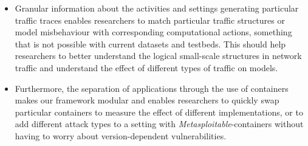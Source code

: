 \documentclass[sigconf]{acmart}
\begin{document}
\begin{itemize}
\begin{itemize}
\item Granular information about the activities and settings generating particular traffic traces enables researchers to match particular traffic structures or model misbehaviour with corresponding computational actions, something that is not possible with current datasets and testbeds. This should help researchers to
better understand the logical small-scale structures in network traffic and understand the effect of different types of traffic on models. 

\item Furthermore, the separation of applications through the use of containers makes our framework modular and enables researchers to quickly swap particular containers to measure the effect of different implementations, or to add different attack types to a setting with \textit{Metasploitable}-containers without having to worry about version-dependent vulnerabilities.
\end{itemize}
\end{itemize}
\end{document}

